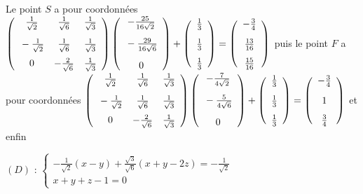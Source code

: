 {{Le point $S$ a pour coordonnées $\left(
\begin{array}{ccc}
\frac{1}{\sqrt{2}}&\frac{1}{\sqrt{6}}&\frac{1}{\sqrt{3}}\\
\rule[-4mm]{0mm}{10mm}-\frac{1}{\sqrt{2}}&\frac{1}{\sqrt{6}}&\frac{1}{\sqrt{3}}\\
0&-\frac{2}{\sqrt{6}}&\frac{1}{\sqrt{3}}
\end{array}
\right)\left(
\begin{array}{c}
-\frac{25}{16\sqrt{2}}\\
\rule{0mm}{6mm}-\frac{29}{16\sqrt{6}}\\
\rule{0mm}{6mm}0
\end{array}\right)+\left(
\begin{array}{c}
\frac{1}{3}\\
\rule[-4mm]{0mm}{10mm}\frac{1}{3}\\
\frac{1}{3}
\end{array}
\right)=\left(
\begin{array}{c}
-\frac{3}{4}\\
\rule[-4mm]{0mm}{10mm}\frac{13}{16}\\
\frac{15}{16}
\end{array}
\right)$ 
puis le point $F$ a pour coordonnées   $\left(
\begin{array}{ccc}
\frac{1}{\sqrt{2}}&\frac{1}{\sqrt{6}}&\frac{1}{\sqrt{3}}\\
\rule[-4mm]{0mm}{10mm}-\frac{1}{\sqrt{2}}&\frac{1}{\sqrt{6}}&\frac{1}{\sqrt{3}}\\
0&-\frac{2}{\sqrt{6}}&\frac{1}{\sqrt{3}}
\end{array}
\right)\left(
\begin{array}{c}
-\frac{7}{4\sqrt{2}}\\
\rule{0mm}{6mm}-\frac{5}{4\sqrt{6}}\\
\rule{0mm}{6mm}0
\end{array}\right)+\left(
\begin{array}{c}
\frac{1}{3}\\
\rule[-4mm]{0mm}{10mm}\frac{1}{3}\\
\frac{1}{3}
\end{array}
\right)=\left(
\begin{array}{c}
-\frac{3}{4}\\
\rule[-4mm]{0mm}{10mm}1\\
\frac{3}{4}
\end{array}
\right)$
et enfin 

$(D)$ :  $\left\{
\begin{array}{l}
-\frac{1}{\sqrt{2}}(x-y)+\frac{\sqrt{3}}{\sqrt{6}}(x+y-2z)=-\frac{1}{\sqrt{2}}\\
x+y+z-1=0
\end{array}
\right.$

}}
